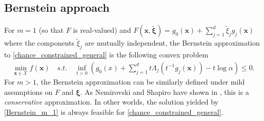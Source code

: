 \documentclass[10pt]{article}
\theoremstyle{definition}
\theoremstyle{plain}
\begin{document}
\subsection{Bernstein approach}\label{Section_Bernstein_general}
For $m=1$ (so that $F$ is real-valued) and $F\left(\boldsymbol{x},\tilde{\boldsymbol{\xi}}\right) = g_0(\boldsymbol{x})+\sum_{j=1}^d \tilde{\xi}_j g_j(\boldsymbol{x})$ where the components $\tilde{\xi}_j$ are mutually independent, the Bernstein approximation to \eqref{chance_constrained_general} is the following convex problem
\begin{align}\label{Bernstein_m_1}
	\min_{\boldsymbol{x}\in\mathcal{X}} f(\boldsymbol{x}) \quad s.t. \quad \inf_{t>0}\left(g_0(x)+\sum_{j=1}^d t\Lambda_j\left(t^{-1}g_j(\boldsymbol{x})\right)-t\log \alpha\right)\leq 0.
\end{align}
For $m>1$, the Bernstein approximation can be similarly defined under mild assumptions on $F$ and $\boldsymbol{\xi}$. As Nemirovski and Shapiro have shown in \cite{Nemirovsky_and_Shapiro}, this is a \textit{conservative} approximation. In other worlds, the solution yielded by \eqref{Bernstein_m_1} is always feasible for \eqref{chance_constrained_general}.
\end{document}
